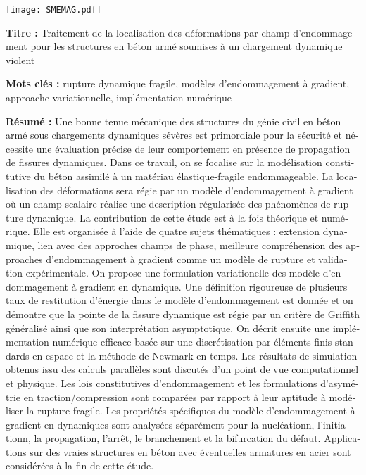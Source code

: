 \pagestyle{empty}

\begin{flushleft}
\texttt{[image: SMEMAG.pdf]}

\vspace{20pt}

\begin{mdframed}
\begin{otherlanguage}{french}
\textbf{Titre :} Traitement de la localisation des déformations par champ d'endommagement pour les structures en béton armé soumises à un chargement dynamique violent

\textbf{Mots clés :} rupture dynamique fragile, modèles d'endommagement à gradient, approache variationnelle, implémentation numérique

\textbf{Résumé :} Une bonne tenue mécanique des structures du génie civil en béton armé sous chargements dynamiques sévères est primordiale pour la sécurité et nécessite une évaluation précise de leur comportement en présence de propagation de fissures dynamiques. Dans ce travail, on se focalise sur la modélisation constitutive du béton assimilé à un matériau élastique-fragile endommageable. La localisation des déformations sera régie par un modèle d'endommagement à gradient où un champ scalaire réalise une description régularisée des phénomènes de rupture dynamique. La contribution de cette étude est à la fois théorique et numérique. Elle est organisée à l'aide de quatre sujets thématiques : extension dynamique, lien avec des approches champs de phase, meilleure compréhension des approaches d'endommagement à gradient comme un modèle de rupture et validation expérimentale. On propose une formulation variationelle des modèle d'endommagement à gradient en dynamique. Une définition rigoureuse de plusieurs taux de restitution d'énergie dans le modèle d'endommagement est donnée et on démontre que la pointe de la fissure dynamique est régie par un critère de Griffith généralisé ainsi que son interprétation asymptotique. On décrit ensuite une implémentation numérique efficace basée sur une discrétisation par éléments finis standards en espace et la méthode de Newmark en temps. Les résultats de simulation obtenus issu des calculs parallèles sont discutés d'un point de vue computationnel et physique. Les lois constitutives d'endommagement et les formulations d'asymétrie en traction/compression sont comparées par rapport à leur aptitude à modéliser la rupture fragile. Les propriétés spécifiques du modèle d'endommagement à gradient en dynamiques sont analysées séparément pour la nucléationn, l'initiationn, la propagation, l'arrêt, le branchement et la bifurcation du défaut. Applications sur des vraies structures en béton avec  éventuelles armatures en acier sont considérées à la fin de cette étude.
\end{otherlanguage}
\end{mdframed}


\end{flushleft}
